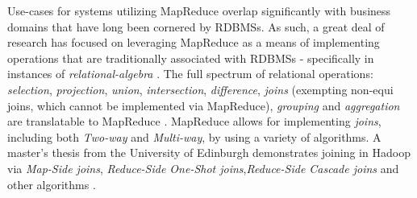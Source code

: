 Use-cases for systems utilizing MapReduce overlap significantly with business domains that have long been cornered by RDBMSs. As such, a great deal of research has focused on leveraging MapReduce as a means of implementing operations that are traditionally associated with RDBMSs - specifically in instances of \textit{relational-algebra} \cite{mining2011,chandar2010}. The full spectrum of relational operations: \textit{selection}, \textit{projection}, \textit{union}, \textit{intersection}, \textit{difference}, \textit{joins} (exempting non-equi joins, which cannot be implemented via MapReduce), \textit{grouping} and \textit{aggregation} are translatable to MapReduce \cite{mining2011}. MapReduce allows for implementing \textit{joins}, including both \textit{Two-way} and \textit{Multi-way}, by using a variety of algorithms. A master’s thesis from the University of Edinburgh demonstrates joining in Hadoop via \textit{Map-Side joins}, \textit{Reduce-Side One-Shot joins},\textit{Reduce-Side Cascade joins} and other algorithms \cite{chandar2010}.